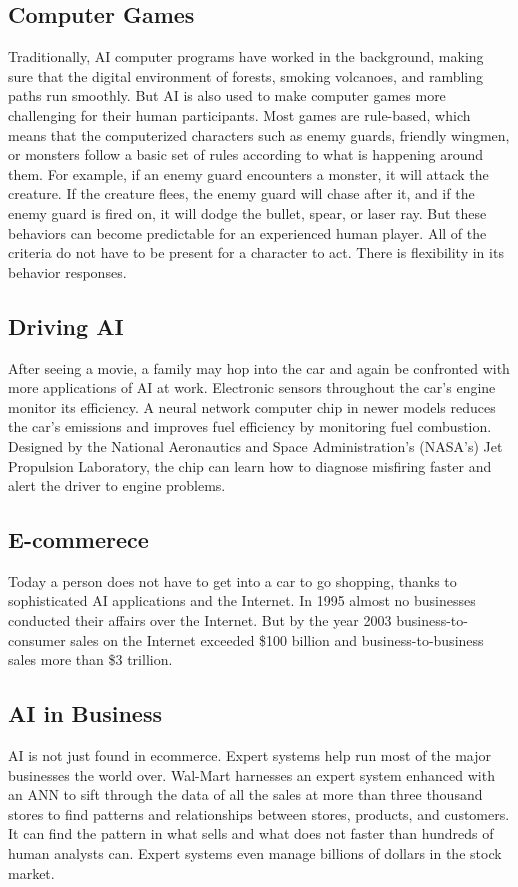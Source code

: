 \documentclass[12pt]{article}
\begin{document}
\subsection{Computer Games}
\large
Traditionally, AI computer programs have worked in the background, making sure that the digital environment of forests, smoking volcanoes, and rambling paths run smoothly. But AI is also used to make computer games more challenging for their human participants. Most games are rule-based, which means that the computerized characters such as enemy guards, friendly wingmen, or monsters follow a basic set of rules according to what is happening around them. For example, if an enemy guard encounters a monster, it will attack the creature. If the creature flees, the enemy guard will chase after it, and if the enemy guard is fired on, it will dodge the bullet, spear, or laser ray. But these behaviors can become predictable for an experienced human player. All of the criteria do not have to be present for a character to act. There is flexibility in its behavior responses.  \\
\huge
\subsection{Driving AI}
\large
After seeing a movie, a family may hop into the car and again be confronted with more applications of AI at work. Electronic sensors throughout the car’s engine monitor its efficiency. A neural network computer chip in newer models reduces the car’s emissions and improves fuel efficiency by monitoring fuel combustion. Designed by the National Aeronautics and Space Administration’s (NASA’s) Jet Propulsion Laboratory, the chip can learn how to diagnose misfiring faster and alert the driver to engine problems.\\
\huge
\subsection{E-commerece}
\large
Today a person does not have to get into a car to go shopping, thanks to sophisticated AI applications and the Internet. In 1995 almost no businesses conducted their affairs over the Internet. But by the year 2003 business-to-consumer sales on the Internet exceeded \$100 billion and business-to-business sales more than \$3 trillion.\\ 
\huge
\subsection{AI in Business}
\large
 AI is not just found in ecommerce. Expert systems help run most of the major businesses the world over. Wal-Mart harnesses an expert system enhanced with an ANN to sift through the data of all the sales at more than three thousand stores to find patterns and relationships between stores, products, and customers. It can find the pattern in what sells and what does not faster than hundreds of human analysts can. Expert systems even manage billions of dollars in the stock market.\\
 \huge
\end{document}
